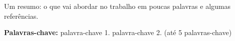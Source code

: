 Um resumo: o que vai abordar no trabalho em poucas palavras e
algumas referências.

\vspace*{.05\textheight}

\noindent \textbf{Palavras-chave:} palavra-chave 1. palavra-chave 2. (até 5 palavras-chave)
